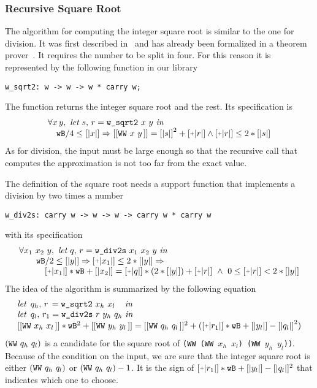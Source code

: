 \subsubsection{Recursive Square Root}

The algorithm for computing the integer square root is similar to the one for division.
It was first described in~\cite{RecSqrt} and has already been formalized in a 
theorem prover~\cite{BerMagZim02}. It requires the number to be split
in four. For this reason it is represented by the following function in our
library
\begin{verbatim}
w_sqrt2: w -> w -> w * carry w;
\end{verbatim}
The function returns the integer square root and the rest.
Its specification is
$$\begin{array}{l}
\forall x\, y,\,\, \textit{let}\,\, s,\, r = \texttt{w\_sqrt2}\,\, x\,\, y\,\, \textit{in}\\
\hskip10pt \wB / 4 \le [|x|] \Rightarrow [[\WW x y]] = {[|s|]} ^ 2 + \ICP{r} \land \ICP{r} \le 2 * [|s|]
\end{array}
$$
As for division, the input must be large enough so that the recursive call
that computes the approximation is not too far from the exact value. 

The definition of the square root needs a support function that implements a division
by two times a number
\begin{verbatim}
w_div2s: carry w -> w -> w -> carry w * carry w
\end{verbatim}
with its specification
$$\begin{array}{l}
\forall x_1\,\, x_2\,\, y, \,\, \textit{let}\,\, q,\, r = \texttt{w\_div2s}\,\, x_1\,\, x_2\,\, y\,\, \textit{in}\\
\hskip20pt \wB / 2 \le [|y|] \Rightarrow \ICP{x_1} \le 2 * [|y|] \Rightarrow\\
\hskip30pt \ICP{x_1} * \wB + [|x_2|] = \ICP{q} *  (2 * [|y|]) + \ICP{r} \,\, \land\,\, 0 \le \ICP{r} < 2 * [|y|]
\end{array}
$$
The idea of the algorithm is summarized by the following equation
$$\begin{array}{l}
\textit{let}\,\,\, {q_h} ,\, r\, = \texttt{w\_sqrt2}\,\, {x_h}\,\, {x_l}\quad\, \textit{in}\\
\textit{let}\,\,\, {q_l} ,\, r_1 = \texttt{w\_div2s}\,\, r\,\, {y_h}\,\, {q_h}\,\, \textit{in}\\
{[[\WW {x_h} {x_l}]]} * \wB ^ 2 + [[\WW {y_h} {y_l}]] =
    [[\WW {q_h} {q_l}]] ^ 2 + (\ICP{r_1} * \wB + [|{y_l}|] - {[|q_l|]} ^ 2) \\
\end{array}
$$
$(\texttt{WW}\,\,q_h\,\,q_l\,\!)$ is a candidate
for the square root of {\tt (WW (WW $x_h$ $x_l$) (WW $y_h$ $y_l$))}. Because of the condition on
the input, we are sure that the integer square root is either 
$(\texttt{WW}\,\,q_h\,\,q_l\,\!)$ or
$(\texttt{WW}\,\,q_h\,\,q_l\,\!) - 1$. It is the sign of $\ICP{r_1} * \wB + 
[|{y_l}|] - [|q_l|] ^ 2$ that indicates which one to choose. 
